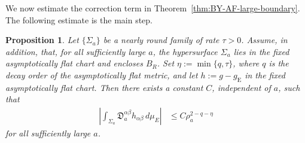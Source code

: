 \documentclass[10pt,a4paper]{amsart}
\newcommand{\gE}{g_{\mathrm{E}}}
\newtheorem{proposition}[theorem]{Proposition}
\begin{document}
	We now estimate the correction term in
	Theorem~\ref{thm:BY-AF-large-boundary}. The following estimate is the
	main step.
	
	\begin{proposition}\label{prop:BY-nearly-round-correction}
		Let $\{\Sigma_a\}$ be a nearly round family of rate $\tau>0$.
		Assume, in addition, that, for all sufficiently large $a$, the
		hypersurface $\Sigma_a$ lies in the fixed asymptotically flat chart and
		encloses $B_R$. Set $\eta:=\min\{q,\tau\}$, where $q$ is the decay order
		of the asymptotically flat metric, and let $h:=g-\gE$ in the fixed
		asymptotically flat chart. Then there exists a constant $C$, independent
		of $a$, such that
		\begin{align}
			\label{eq:BY-nearly-round-correction-estimate}
			\left|
			\int_{\Sigma_a}
			\mathfrak D_a^{\alpha\beta}
			h_{\alpha\beta}\,d\mu_E
			\right|
			&\leq
			C\rho_a^{2-q-\eta}
		\end{align}
		for all sufficiently large $a$.
	\end{proposition}
	
\end{document}
